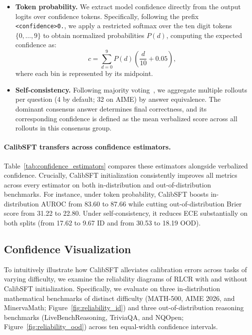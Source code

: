 \documentclass{article} %
\begin{document}
\begin{itemize}
    \item \textbf{Token probability.} We extract model confidence directly from the output logits over confidence tokens. 
    Specifically, following the prefix \texttt{<confidence>0.}, we apply a restricted softmax over the ten digit tokens $\{0,\ldots,9\}$ to obtain normalized probabilities $P(d)$, computing the expected confidence as:
        \begin{equation*}
            c = \sum_{d=0}^{9} P(d)\left(\frac{d}{10} + 0.05\right),
        \end{equation*}
        where each bin is represented by its midpoint.
   
    \item \textbf{Self-consistency.} Following majority voting~\citep{wang2023selfconsistency}, 
    we aggregate multiple rollouts per question (4 by default; 32 on AIME) by answer equivalence. 
    The dominant consensus answer determines final correctness, and its corresponding confidence is defined as the mean verbalized score across all rollouts in this consensus group.

\end{itemize}

\paragraph{CalibSFT transfers across confidence estimators.}
Table~\ref{tab:confidence_estimators} compares these estimators alongside verbalized confidence. 
Crucially, CalibSFT initialization consistently improves all metrics across every estimator on both in-distribution and out-of-distribution benchmarks. 
For instance, under token probability, CalibSFT boosts in-distribution AUROC from 83.60 to 87.66 while cutting out-of-distribution Brier score from 31.22 to 22.80. 
Under self-consistency, it reduces ECE substantially on both splits (from 17.62 to 9.67 ID and from 30.53 to 18.19 OOD). 




\subsection{Confidence Visualization}
\label{sec:confidence_visualization}

To intuitively illustrate how CalibSFT alleviates calibration errors across tasks of varying difficulty, 
we examine the reliability diagrams of RLCR with and without CalibSFT initialization. 
Specifically, we evaluate on three in-distribution mathematical benchmarks of distinct difficulty 
(MATH-500, AIME 2026, and MinervaMath; Figure~\ref{fig:reliability_id})
and three out-of-distribution reasoning benchmarks (LiveBenchReasoning, TriviaQA, and NQOpen; Figure~\ref{fig:reliability_ood})
across ten equal-width confidence intervals. 
\end{document}
